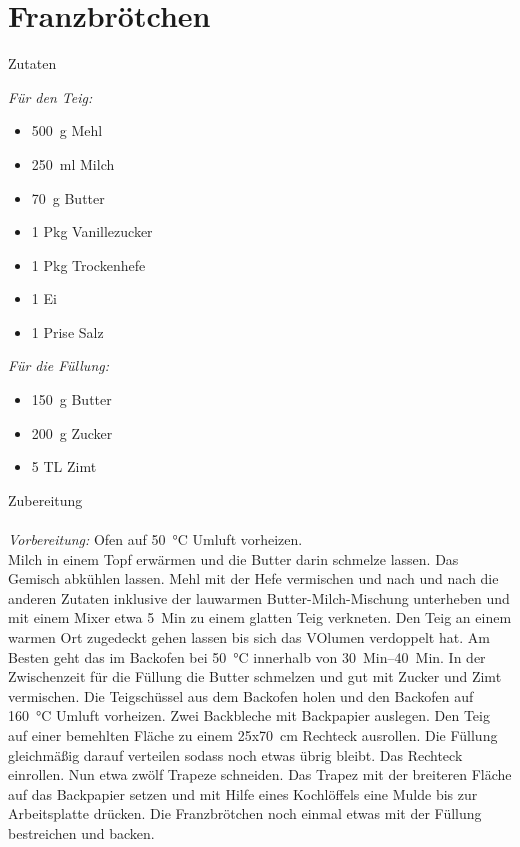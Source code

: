 \section*{Franzbrötchen}
\ihead{}\ohead{}
\cfoot{}
{\Large Zutaten}
\begin{multicols}{2}
\textit{Für den Teig:}
\begin{itemize}
    \item \SI{500}{g} Mehl
    \item \SI{250}{ml} Milch
    \item \SI{70}{g} Butter
    \item \num{1} Pkg Vanillezucker
    \item \num{1} Pkg Trockenhefe
    \item \num{1} Ei
    \item \num{1} Prise Salz
\end{itemize}
\textit{Für die Füllung:}
\begin{itemize}
    \item \SI{150}{g} Butter
    \item \SI{200}{g} Zucker
    \item \num{5} TL Zimt
\end{itemize}
\end{multicols}
\noindent
{\Large Zubereitung}\\
\\
\textit{Vorbereitung:} Ofen auf \SI{50}{\celsius} Umluft vorheizen.\\
Milch in einem Topf erwärmen und die Butter darin schmelze lassen.
Das Gemisch abkühlen lassen. 
Mehl mit der Hefe vermischen und nach und nach die anderen Zutaten inklusive der lauwarmen Butter-Milch-Mischung unterheben und mit einem Mixer etwa \SI{5}{Min} zu einem glatten Teig verkneten.
Den Teig an einem warmen Ort zugedeckt gehen lassen bis sich das VOlumen verdoppelt hat. 
Am Besten geht das im Backofen bei \SI{50}{\celsius} innerhalb von \SIrange{30}{40}{Min}. 
In der Zwischenzeit für die Füllung die Butter schmelzen und gut mit Zucker und Zimt vermischen. 
Die Teigschüssel aus dem Backofen holen und den Backofen auf \SI{160}{\celsius} Umluft vorheizen.
Zwei Backbleche mit Backpapier auslegen. 
Den Teig auf einer bemehlten Fläche zu einem \num{25}x\SI{70}{cm} Rechteck ausrollen. 
Die Füllung gleichmäßig darauf verteilen sodass noch etwas übrig bleibt. 
Das Rechteck einrollen.
Nun etwa zwölf Trapeze schneiden. 
Das Trapez mit der breiteren Fläche auf das Backpapier setzen und mit Hilfe eines Kochlöffels eine Mulde bis zur Arbeitsplatte drücken.
Die Franzbrötchen noch einmal etwas mit der Füllung bestreichen und  backen. 
